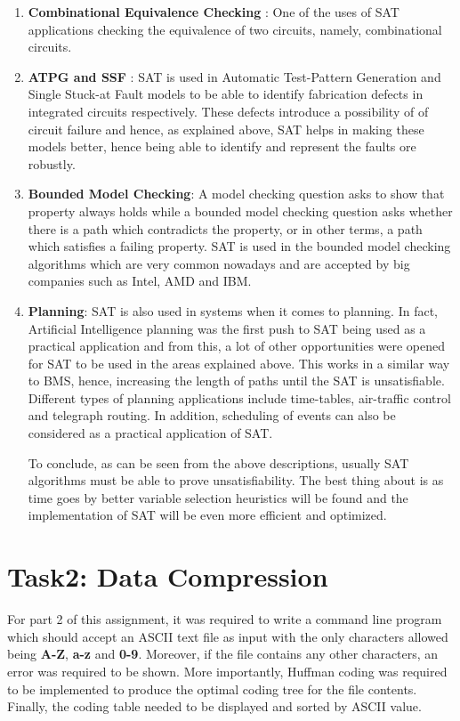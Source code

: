 \documentclass{article}
\begin{document}
\begin{enumerate}
\item \textbf{Combinational Equivalence Checking} : One of the uses of SAT applications checking the equivalence of two circuits, namely, combinational circuits\cite{pa3}. 
\item \textbf{ATPG and SSF} : SAT is used in Automatic Test-Pattern Generation and Single Stuck-at Fault models to be able to identify  fabrication defects in integrated circuits respectively\cite{pa3}. These defects introduce a possibility of of circuit failure and hence, as explained above, SAT helps in making these models better, hence being able to identify and represent the faults ore robustly.
\item \textbf{Bounded Model Checking}: A model checking question asks to show that property always holds while a bounded model checking question asks whether there is a path which contradicts the property, or in other terms, a path which satisfies a failing property. SAT is used in the bounded model checking algorithms which are very common nowadays and are accepted by big companies such as Intel, AMD and IBM\cite{pa1}.
\item \textbf{Planning}: SAT is also used in systems when it comes to planning. In fact, Artificial Intelligence planning was the first push to SAT being used as a practical application\cite{pa3} and from this, a lot of other opportunities were opened for SAT to be used in the areas explained above. This works in a similar way to BMS, hence, increasing the length of paths until the SAT is unsatisfiable. Different types of planning applications include time-tables, air-traffic control and telegraph routing\cite{pa1}. In addition, scheduling of events can also be considered as a practical application of SAT.

	To conclude, as can be seen from the above descriptions, usually SAT algorithms must be able to prove unsatisfiability. The best thing about is as time goes by better variable selection heuristics will be found and the implementation of SAT will be even more efficient and optimized. 

\end{enumerate}

\pagebreak


		\section{Task2: Data	Compression}
		
		For part 2 of this assignment, it was required to write a command line program which should accept an ASCII text file as input with the only characters allowed being \textbf{A-Z}, \textbf{a-z} and \textbf{0-9}. Moreover, if the file contains any other characters, an error was required to be shown. More importantly, Huffman coding was required to be implemented to produce the optimal coding tree for the file contents. Finally, the coding table needed to be displayed and sorted by ASCII value. 
		
\end{document}
